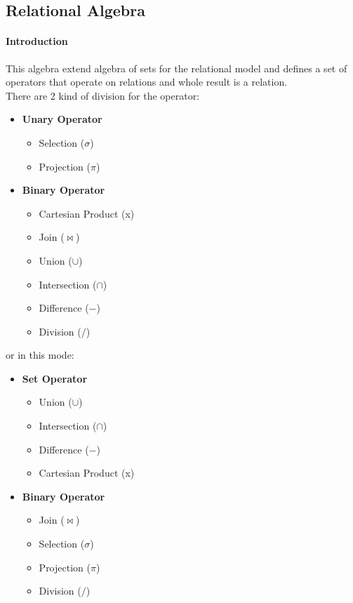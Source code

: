 \documentclass[12pt]{article}
\begin{document}
\subsection{Relational Algebra}
\paragraph{Introduction}
This algebra extend algebra of sets for the relational model and defines a set of operators that operate on relations and whole result is a relation.\\
There are 2 kind of division for the operator:
\begin{itemize}
  \item \textbf{Unary Operator}
  \begin{itemize}
    \item Selection ($\sigma$)
    \item Projection ($\pi$)
  \end{itemize}
  \item \textbf{Binary Operator}
  \begin{itemize}
    \item Cartesian Product (x)
    \item Join ($\bowtie$)
    \item Union ($\cup$)
    \item Intersection ($\cap$)
    \item Difference ($-$)
    \item Division ($/$)
  \end{itemize}
\end{itemize}
or in this mode:
\begin{itemize}
  \item \textbf{Set Operator}
  \begin{itemize}
    \item Union ($\cup$)
    \item Intersection ($\cap$)
    \item Difference ($-$)
    \item Cartesian Product (x)
  \end{itemize}
  \item \textbf{Binary Operator}
  \begin{itemize}
    \item Join ($\bowtie$)
    \item Selection ($\sigma$)
    \item Projection ($\pi$)
    \item Division ($/$)
  \end{itemize}
\end{itemize}
\end{document}
